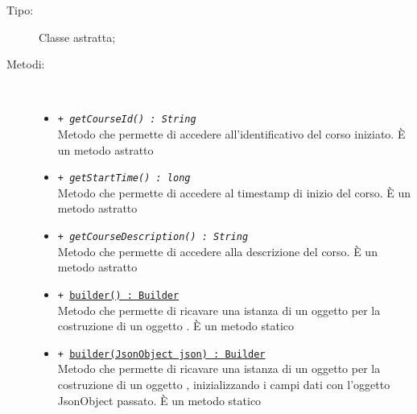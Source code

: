 \documentclass[../Tesi.tex]{subfiles}
\begin{document}
		\begin{description}
			\item[Tipo:] Classe astratta;
			
			\item[Metodi:] \
			\begin{itemize}
				\item \texttt{+ \textit{getCourseId() : String}}\\
				Metodo che permette di accedere all'identificativo del corso iniziato. È un metodo astratto

				\item \texttt{+ \textit{getStartTime() : long}}\\
				Metodo che permette di accedere al timestamp di inizio del corso. È un metodo astratto

				\item \texttt{+ \textit{getCourseDescription() : String}}\\
				Metodo che permette di accedere alla descrizione del corso. È un metodo astratto

				\item \texttt{+ \underline{builder() : Builder}}\\
				Metodo che permette di ricavare una istanza di un oggetto  per la costruzione di un oggetto . È un metodo statico

				\item \texttt{+ \underline{builder(JsonObject json) : Builder}}\\
				Metodo che permette di ricavare una istanza di un oggetto  per la costruzione di un oggetto , inizializzando i campi dati con l'oggetto JsonObject passato. È un metodo statico

			\end{itemize}
		\end{description}
\end{document}
